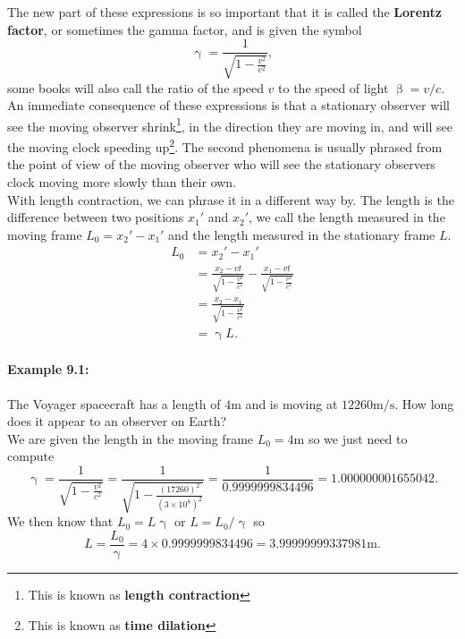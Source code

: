 \documentclass[a4paper,12pt]{book}
\begin{document}
The new part of these expressions is so important that it is called the \textbf{Lorentz factor}, or sometimes the gamma factor, and is given the symbol
\begin{equation}
\upgamma=\frac{1}{\sqrt{1-\frac{v^{2}}{c^{2}}}},
\end{equation}
some books will also call the ratio of the speed $v$ to the speed of light $\upbeta=v/c$.\\

An immediate consequence of these expressions is that a stationary observer will see the moving observer shrink\footnote{This is known as \textbf{length contraction}}, in the direction they are moving in, and will see the moving clock speeding up\footnote{This is known as \textbf{time dilation}}. The second phenomena is usually phrased from the point of view of the moving observer who will see the stationary observers clock moving more slowly than their own.\\

With length contraction, we can phrase it in a different way by. The length is the difference between two positions $x_{1}'$ and $x_{2}'$, we call the length measured in the moving frame $L_{0}=x_{2}'-x_{1}'$ and the length measured in the stationary frame $L$.
\begin{align*}
L_{0}&=x_{2}'-x_{1}'\\
	&=\frac{x_{2}-vt}{\sqrt{1-\frac{v^{2}}{c^{2}}}}-\frac{x_{1}-vt}{\sqrt{1-\frac{v^{2}}{c^{2}}}}\\
	&=\frac{x_{2}-x_{1}}{\sqrt{1-\frac{v^{2}}{c^{2}}}}\\
	&=\upgamma L.
\end{align*}

\paragraph{Example 9.1:} The Voyager spacecraft has a length of $4\text{m}$ and is moving at $12 260\text{m/s}$. How long does it appear to an observer on Earth?\\

We are given the length in the moving frame $L_{0}=4\text{m}$ so we just need to compute 
\begin{equation*}
\upgamma=\frac{1}{\sqrt{1-\frac{v^{2}}{c^{2}}}}=\frac{1}{\sqrt{1-\frac{(17260)^{2}}{(3\times10^{8})^{2}}}}=\frac{1}{0.9999999834496}=1.000000001655042.
\end{equation*}
We then know that $L_{0}=L\upgamma$ or $L=L_{0}/\upgamma$ so
\begin{equation*}
L=\frac{L_{0}}{\upgamma}=4\times0.9999999834496=3.99999999337981\text{m}.
\end{equation*}
\end{document}
